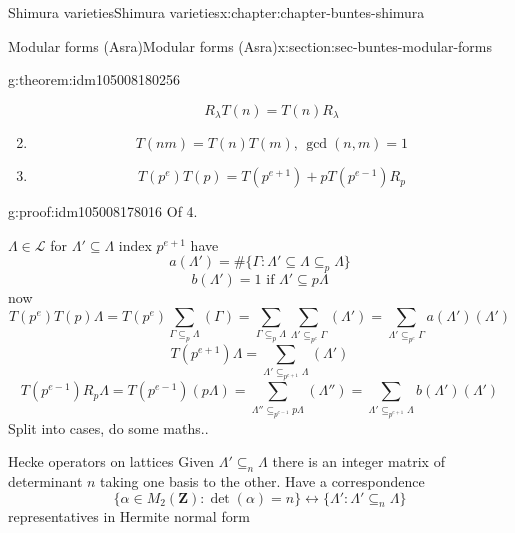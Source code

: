 \documentclass[oneside,10pt,]{book}
\numberwithin{equation}{section}
\newcommand{\ZZ}{\mathbf{Z}}
\begin{document}
\begin{chapterptx}{Shimura varieties}{}{Shimura varieties}{}{}{x:chapter:chapter-buntes-shimura}
\begin{sectionptx}{Modular forms (Asra)}{}{Modular forms (Asra)}{}{}{x:section:sec-buntes-modular-forms}
\begin{theorem}{}{}{g:theorem:idm105008180256}
\begin{enumerate}
\begin{equation*}
R_\lambda T(n) = T(n) R_{\lambda}
\end{equation*}
%
\item{}%
\begin{equation*}
T(nm) = T(n) T(m),\,\gcd(n,m) =1
\end{equation*}
%
\item{}%
\begin{equation*}
T(p^e)T(p) = T(p^{e+1 }) + p T(p^{e-1}) R_p
\end{equation*}
%
\end{enumerate}
%
\end{theorem}
\begin{proofptx}{}{g:proof:idm105008178016}
Of 4.%
\par
\(\Lambda \in \mathcal L\) for \(\Lambda' \subseteq \Lambda \) index \(p^{e+1}\) have%
\begin{equation*}
a(\Lambda')  = \# \{ \Gamma : \Lambda'  \subseteq \Lambda \subseteq_p \Lambda \}
\end{equation*}
%
\begin{equation*}
b(\Lambda')  = 1 \text{ if } \Lambda' \subseteq p\Lambda
\end{equation*}
now%
\begin{equation*}
T(p^e)T(p) \Lambda = T(p^e) \sum_{\Gamma \subseteq_p \Lambda } (\Gamma) = \sum_{\Gamma \subseteq_p \Lambda } \sum_{\Lambda' \subseteq_{p^e} \Gamma} (\Lambda') =\sum_{\Lambda' \subseteq_{p^e} \Gamma}  a(\Lambda') (\Lambda')
\end{equation*}
%
\begin{equation*}
T(p^{e+1} ) \Lambda  =  \sum_{\Lambda'\subseteq_{p^{e+1}} \Lambda} (\Lambda')
\end{equation*}
%
\begin{equation*}
T(p^{e-1} )R_p \Lambda  =  T(p^{e-1}) (p \Lambda) = \sum_{\Lambda'' \subseteq_{p^{e-1}} p\Lambda } (\Lambda'') = \sum_{\Lambda' \subseteq_{p^{e+1}} \Lambda} b(\Lambda') (\Lambda')
\end{equation*}
Split into cases, do some maths..%
\end{proofptx}
Hecke operators on lattices Given \(\Lambda' \subseteq_n \Lambda\) there is an integer matrix of determinant  \(n\) taking one basis to the other. Have a correspondence%
\begin{equation*}
\{ \alpha \in M_2(\ZZ) : \det(\alpha) = n \}  \leftrightarrow \{ \Lambda ' : \Lambda ' \subseteq_n \Lambda\}
\end{equation*}
representatives in Hermite normal form%

\end{sectionptx}
\end{chapterptx}
\end{document}
